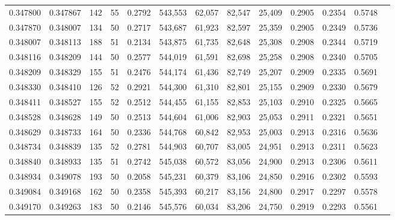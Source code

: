 \begin{tabular}{rrrrrrrrrrrrr}
0.347800 & 0.347867 &   142 &  55 &                                     0.2792 & 543,553 &  62,057 &  82,547 &  25,409 & 0.2905 & 0.2354 & 0.5748 \\
0.347870 & 0.348007 &   134 &  50 &                                     0.2717 & 543,687 &  61,923 &  82,597 &  25,359 & 0.2905 & 0.2349 & 0.5736 \\
0.348007 & 0.348113 &   188 &  51 &                                     0.2134 & 543,875 &  61,735 &  82,648 &  25,308 & 0.2908 & 0.2344 & 0.5719 \\
0.348116 & 0.348209 &   144 &  50 &                                     0.2577 & 544,019 &  61,591 &  82,698 &  25,258 & 0.2908 & 0.2340 & 0.5705 \\
0.348209 & 0.348329 &   155 &  51 &                                     0.2476 & 544,174 &  61,436 &  82,749 &  25,207 & 0.2909 & 0.2335 & 0.5691 \\
0.348330 & 0.348410 &   126 &  52 &                                     0.2921 & 544,300 &  61,310 &  82,801 &  25,155 & 0.2909 & 0.2330 & 0.5679 \\
0.348411 & 0.348527 &   155 &  52 &                                     0.2512 & 544,455 &  61,155 &  82,853 &  25,103 & 0.2910 & 0.2325 & 0.5665 \\
0.348528 & 0.348628 &   149 &  50 &                                     0.2513 & 544,604 &  61,006 &  82,903 &  25,053 & 0.2911 & 0.2321 & 0.5651 \\
0.348629 & 0.348733 &   164 &  50 &                                     0.2336 & 544,768 &  60,842 &  82,953 &  25,003 & 0.2913 & 0.2316 & 0.5636 \\
0.348734 & 0.348839 &   135 &  52 &                                     0.2781 & 544,903 &  60,707 &  83,005 &  24,951 & 0.2913 & 0.2311 & 0.5623 \\
0.348840 & 0.348933 &   135 &  51 &                                     0.2742 & 545,038 &  60,572 &  83,056 &  24,900 & 0.2913 & 0.2306 & 0.5611 \\
0.348934 & 0.349078 &   193 &  50 &                                     0.2058 & 545,231 &  60,379 &  83,106 &  24,850 & 0.2916 & 0.2302 & 0.5593 \\
0.349084 & 0.349168 &   162 &  50 &                                     0.2358 & 545,393 &  60,217 &  83,156 &  24,800 & 0.2917 & 0.2297 & 0.5578 \\
0.349170 & 0.349263 &   183 &  50 &                                     0.2146 & 545,576 &  60,034 &  83,206 &  24,750 & 0.2919 & 0.2293 & 0.5561 \\

\end{tabular}
